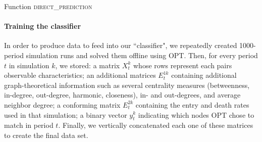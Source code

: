 \documentclass[format=acmsmall, review=false]{acmart}
\begin{document}
\begin{algorithm}[htbp]
	\SetAlgoLined
  \DontPrintSemicolon
	

	\caption{Function \textsc{direct\_prediction}}
	\label{alg:direct_prediction}
\end{algorithm}

\paragraph{Training the classifier} In order to produce data to feed into our ``classifier", we repeatedly created 1000-period simulation runs and solved them offline using \textsc{OPT}. Then, for every period $t$ in simulation $k$, we stored: a matrix $X_t^{k}$ whose rows represent each pairs observable characteristics; an additional matrices $E_{t}^{1k}$ containing additional graph-theoretical information such as several centrality measures (betweenness, in-degree, out-degree, harmonic, closeness), in- and out-degrees, and average neighbor degree; a conforming matrix $E_{t}^{2k}$ containing the entry and death rates used in that simulation; a binary vector $y_t^{k}$ indicating which nodes \textsc{OPT} chose to match in period $t$. Finally, we vertically concatenated each one of these matrices to create the final data set.
\end{document}
